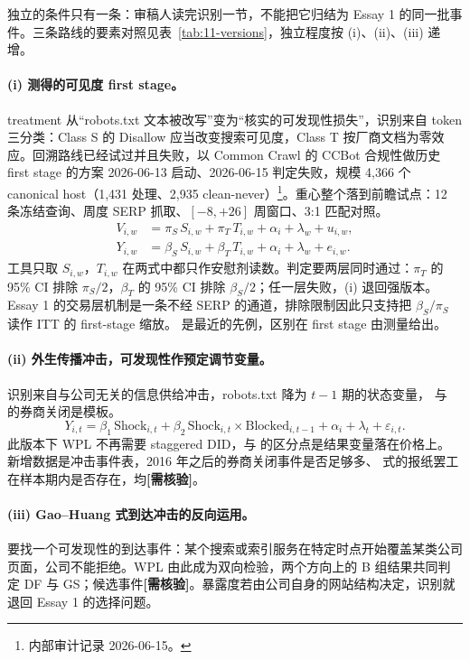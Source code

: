 \documentclass[a4paper,11pt]{ctexart}
\begin{document}
独立的条件只有一条：审稿人读完识别一节，不能把它归结为 Essay 1 的同一批事件。三条路线的要素对照见表~\ref{tab:11-versions}，独立程度按 (i)、(ii)、(iii) 递增。

\paragraph{(i) 测得的可见度 first stage。}treatment 从“robots.txt 文本被改写”变为“核实的可发现性损失”，识别来自 token 三分类：Class S 的 Disallow 应当改变搜索可见度，Class T 按厂商文档为零效应。回溯路线已经试过并且失败，以 Common Crawl 的 CCBot 合规性做历史 first stage 的方案 2026-06-13 启动、2026-06-15 判定失败，规模 4{,}366 个 canonical host（1{,}431 处理、2{,}935 clean-never）\footnote{内部审计记录 2026-06-15。}。重心整个落到前瞻试点：12 条冻结查询、周度 SERP 抓取、$[-8,+26]$ 周窗口、3:1 匹配对照。
\begin{align}
V_{i,w}&=\pi_S\, S_{i,w}+\pi_T\, T_{i,w}+\alpha_i+\lambda_w+u_{i,w},\label{eq:11-fs}\\
Y_{i,w}&=\beta_S\, S_{i,w}+\beta_T\, T_{i,w}+\alpha_i+\lambda_w+e_{i,w}.\label{eq:11-ss}
\end{align}
工具只取 $S_{i,w}$，$T_{i,w}$ 在两式中都只作安慰剂读数。判定要两层同时通过：$\pi_T$ 的 95\% CI 排除 $\pi_S/2$，$\beta_T$ 的 95\% CI 排除 $\beta_S/2$；任一层失败，(i) 退回强版本。Essay 1 的交易层机制是一条不经 SERP 的通道，排除限制因此只支持把 $\beta_S/\pi_S$ 读作 ITT 的 first-stage 缩放。\citet{stice2023} 是最近的先例，区别在 first stage 由测量给出。

\paragraph{(ii) 外生传播冲击，可发现性作预定调节变量。}识别来自与公司无关的信息供给冲击，robots.txt 降为 $t-1$ 期的状态变量，\citet{kellyljungqvist2012} 与 \citet{balakrishnanetal2014} 的券商关闭是模板。
\begin{equation}\label{eq:11-mod}
Y_{i,t}=\beta_1\,\text{Shock}_{i,t}+\beta_2\,\text{Shock}_{i,t}\times \text{Blocked}_{i,t-1}+\alpha_i+\lambda_t+\varepsilon_{i,t}.
\end{equation}
此版本下 WPL 不再需要 staggered DID，与 \citet{changljungqvisttseng2023} 的区分点是结果变量落在价格上。新增数据是冲击事件表，2016 年之后的券商关闭事件是否足够多、\citet{peress2014} 式的报纸罢工在样本期内是否存在，均\textbf{[需核验]}。

\paragraph{(iii) Gao--Huang 式到达冲击的反向运用。}要找一个可发现性的到达事件：某个搜索或索引服务在特定时点开始覆盖某类公司页面，公司不能拒绝\citep{gaohuang2020}。WPL 由此成为双向检验，两个方向上的 B 组结果共同判定 DF 与 GS；候选事件\textbf{[需核验]}。暴露度若由公司自身的网站结构决定，识别就退回 Essay 1 的选择问题。
\end{document}
